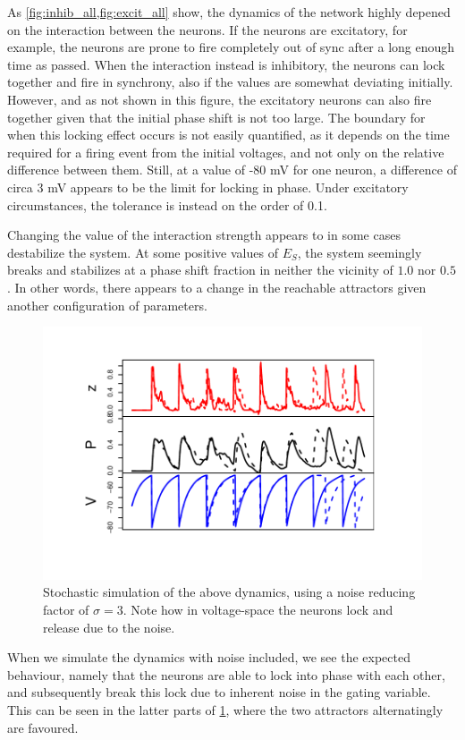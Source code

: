 \documentclass[10pt]{article}
\theoremstyle{plain}
\begin{document}
\begin{multicols*}{2}
As \cref{fig:inhib_all,fig:excit_all} show, the dynamics of the network highly
depened on the interaction between the neurons. If the neurons are excitatory,
for example, the neurons are prone to fire completely out of sync after a long
enough time as passed. When the interaction instead is inhibitory, the neurons
can lock together and fire in synchrony, also if the values are somewhat
deviating initially. However, and as not shown in this figure, the excitatory
neurons can also fire together given that the initial phase shift is not too
large. The boundary for when this locking effect occurs is not easily quantified,
as it depends on the time required for a firing event from the initial
voltages, and not only on the relative difference between them. Still, at a
value of -80 mV for one neuron, a difference of circa 3 mV appears to be the
limit for locking in phase. Under excitatory circumstances, the tolerance is instead
on the order of 0.1.

Changing the value of the interaction strength appears to in some cases
destabilize the system. At some positive values of $E_S$, the system seemingly
breaks and stabilizes at a phase shift fraction in neither the vicinity of
$1.0$ nor $0.5$. In other words, there appears to a change in the reachable
attractors given another configuration of parameters.

\begin{figure}[H]
  \centering
  \includegraphics[trim={0 1cm 0 1.cm}, clip, scale=.55]{stochastic}
  \caption{Stochastic simulation of the above dynamics, using a noise reducing factor of
  $\sigma = 3$. Note how in voltage-space the neurons lock and release due to
the noise.}
  \label{fig:stochastic}
\end{figure}
When we simulate the dynamics with noise included, we see the expected
behaviour, namely that the neurons are able to lock into phase with each other,
and subsequently break this lock due to inherent noise in the gating variable.
This can be seen in the latter parts of \cref{fig:stochastic}, where the two
attractors alternatingly are favoured.


\end{multicols*}
\end{document}

